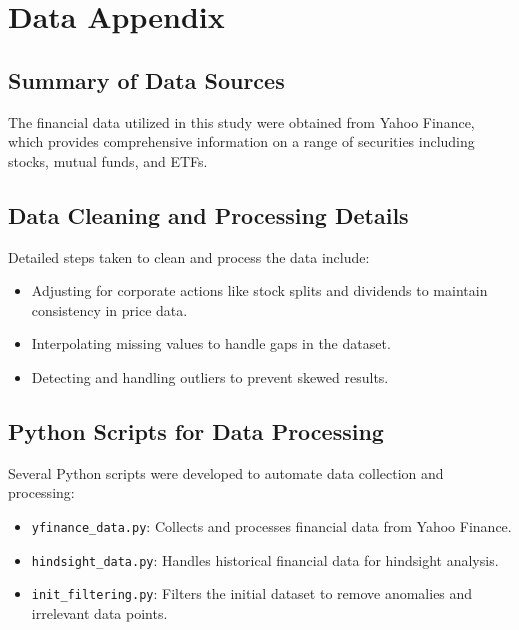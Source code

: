 \appendix
\section{Data Appendix}

\subsection{Summary of Data Sources}
The financial data utilized in this study were obtained from Yahoo Finance, which provides comprehensive information on a range of securities including stocks, mutual funds, and ETFs.

\subsection{Data Cleaning and Processing Details}
Detailed steps taken to clean and process the data include:
\begin{itemize}
    \item Adjusting for corporate actions like stock splits and dividends to maintain consistency in price data.
    \item Interpolating missing values to handle gaps in the dataset.
    \item Detecting and handling outliers to prevent skewed results.
\end{itemize}

\subsection{Python Scripts for Data Processing}
Several Python scripts were developed to automate data collection and processing:
\begin{itemize}
    \item \texttt{yfinance\_data.py}: Collects and processes financial data from Yahoo Finance.
    \item \texttt{hindsight\_data.py}: Handles historical financial data for hindsight analysis.
    \item \texttt{init\_filtering.py}: Filters the initial dataset to remove anomalies and irrelevant data points.
\end{itemize}

